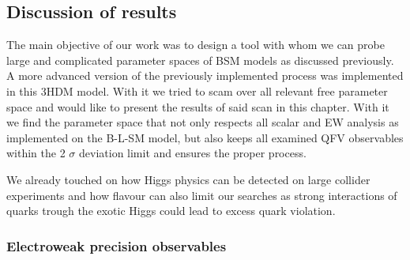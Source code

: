 \subsection{Discussion of results}

The main objective of our work was to design a tool with whom we can probe large and complicated parameter spaces of BSM models as discussed previously. 
%
A more advanced version of the previously implemented process was implemented in this 3HDM model.
%
With it we tried to scam over all relevant free parameter space and would like to present the results of said scan in this chapter. 
%
%
With it we find the parameter space that not only respects all scalar and EW analysis as implemented on the B-L-SM model, but also keeps all examined QFV observables within the 2 $\sigma$ deviation limit and ensures the proper  process. 

We already touched on how Higgs physics can be detected on large collider experiments and how flavour can also limit our searches as strong interactions of quarks trough the exotic Higgs could lead to excess quark violation. %
%
\subsubsection{Electroweak precision observables}

